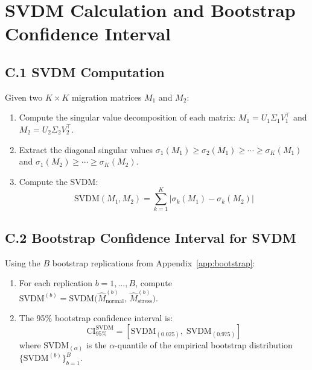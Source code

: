 \documentclass[12pt,a4paper]{article}
\begin{document}
\section{SVDM Calculation and Bootstrap Confidence Interval}
\label{app:svdm}

\subsection*{C.1 SVDM Computation}

Given two $K \times K$ migration matrices $M_1$ and $M_2$:
\begin{enumerate}[noitemsep]
    \item Compute the singular value decomposition of each matrix: $M_1 = U_1 \Sigma_1 V_1^\top$ and $M_2 = U_2 \Sigma_2 V_2^\top$.
    \item Extract the diagonal singular values $\sigma_1(M_1) \geq \sigma_2(M_1) \geq \cdots \geq \sigma_K(M_1)$ and $\sigma_1(M_2) \geq \cdots \geq \sigma_K(M_2)$.
    \item Compute the SVDM:
    \begin{equation}
    \text{SVDM}(M_1, M_2) = \sum_{k=1}^{K} \left|\sigma_k(M_1) - \sigma_k(M_2)\right|
    \end{equation}
\end{enumerate}

\subsection*{C.2 Bootstrap Confidence Interval for SVDM}

Using the $B$ bootstrap replications from Appendix~\ref{app:bootstrap}:
\begin{enumerate}[noitemsep]
    \item For each replication $b = 1, \ldots, B$, compute $\text{SVDM}^{(b)} = \text{SVDM}\bigl(\hat{M}_{\text{normal}}^{(b)},\, \hat{M}_{\text{stress}}^{(b)}\bigr)$.
    \item The 95\% bootstrap confidence interval is:
    \begin{equation}
    \text{CI}_{95\%}^{\text{SVDM}} = \left[\text{SVDM}_{(0.025)},\; \text{SVDM}_{(0.975)}\right]
    \end{equation}
    where $\text{SVDM}_{(\alpha)}$ is the $\alpha$-quantile of the empirical bootstrap distribution $\{\text{SVDM}^{(b)}\}_{b=1}^{B}$.
\end{enumerate}
\end{document}

